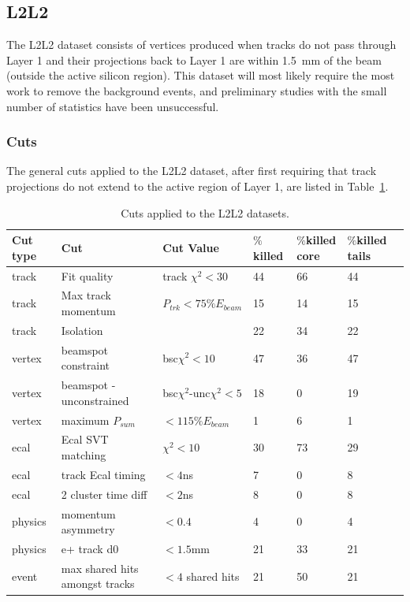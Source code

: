 \subsection{L2L2}

The L2L2 dataset consists of vertices produced when tracks do not pass through Layer 1 and their projections back to Layer 1 are within 1.5~mm of the beam (outside the active silicon region). This dataset will most likely require the most work to remove the background events, and preliminary studies with the small number of statistics have been unsuccessful. 

\subsubsection{Cuts}

The general cuts applied to the L2L2 dataset, after first requiring that track projections do not extend to the active region of Layer 1, are listed in Table~\ref{l2l2_cuts}.

\begin{table}[H]
\caption{Cuts applied to the L2L2 datasets.}
\label{l2l2_cuts}
\centering
\begin{tabular}{lllllll}
\toprule
Cut type & Cut & Cut Value &  $\%$killed &  $\%$killed core & $\%$killed tails\\
\midrule
track & Fit quality & track $\chi^{2}<30$ & 44 & 66 & 44 \\
track & Max track momentum &  $P_{trk}<75\%E_{beam}$ & 15 & 14 & 15 \\
track & Isolation &   & 22 & 34 & 22 \\
vertex & beamspot constraint & bsc$\chi^{2}<10$  & 47 & 36 & 47 \\
vertex & beamspot - unconstrained & bsc$\chi^{2}$-unc$\chi^2<5$  & 18 & 0 & 19 \\
vertex & maximum $P_{sum}$ &  $<115\%E_{beam}$ & 1 & 6 & 1 \\
ecal & Ecal SVT matching & $\chi^2<10$  & 30 & 73 & 29 \\
ecal & track Ecal timing & $<4$ns  & 7 & 0 & 8 \\
ecal & 2 cluster time diff & $<2$ns  & 8 & 0 & 8 \\
physics & momentum asymmetry & $<0.4$  & 4 & 0 & 4 \\
physics & e+ track d0 & $<1.5$mm  & 21 & 33 & 21 \\
event & max shared hits amongst tracks & $<4$ shared hits  & 21 & 50 & 21 \\
\bottomrule
\end{tabular}
\end{table}

